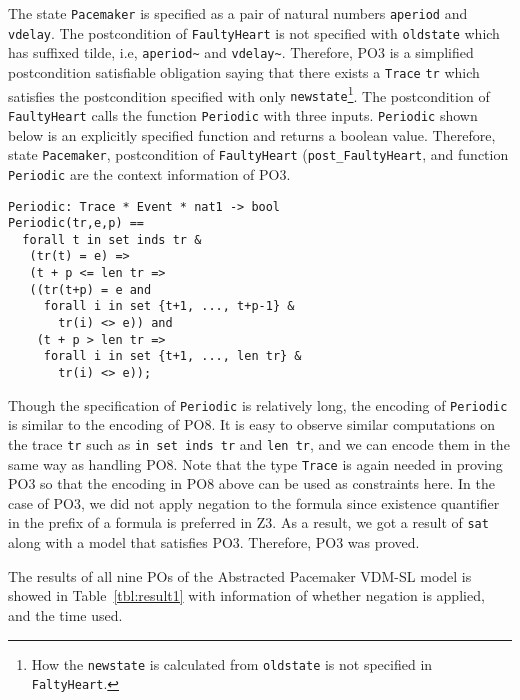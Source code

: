 The state {\tt Pacemaker} is specified as a pair of natural numbers {\tt aperiod} and {\tt vdelay}. The postcondition of {\tt FaultyHeart} is not specified with {\tt oldstate} which has suffixed tilde, i.e, {\tt aperiod\textasciitilde} and {\tt vdelay\textasciitilde}. Therefore, PO3 is a simplified postcondition satisfiable obligation saying that there exists a {\tt Trace} {\tt tr} which satisfies the postcondition specified with only {\tt newstate}\footnote{How the {\tt newstate} is calculated from {\tt oldstate} is not specified in {\tt FaltyHeart}.}. The postcondition of {\tt FaultyHeart} calls the function {\tt Periodic} with three inputs. {\tt Periodic} shown below is an explicitly specified function and returns a boolean value. Therefore, state {\tt Pacemaker}, postcondition of {\tt FaultyHeart} ({\tt post\_FaultyHeart}, and function {\tt Periodic} are the context information of PO3. 

\begin{mdframed}[roundcorner=5pt]
\begin{Verbatim}[fontsize=\small]
Periodic: Trace * Event * nat1 -> bool
Periodic(tr,e,p) ==
  forall t in set inds tr &
   (tr(t) = e) =>
   (t + p <= len tr =>
   ((tr(t+p) = e and
     forall i in set {t+1, ..., t+p-1} &
       tr(i) <> e)) and
    (t + p > len tr =>
     forall i in set {t+1, ..., len tr} &
       tr(i) <> e));
\end{Verbatim}
\end{mdframed}

Though the specification of {\tt Periodic} is relatively long, the encoding of {\tt Periodic} is similar to the encoding of PO8. It is easy to observe similar computations on the trace {\tt tr} such as {\tt in set inds tr} and {\tt len tr}, and we can encode them in the same way as handling PO8. Note that the type {\tt Trace} is again needed in proving PO3 so that the encoding in PO8 above can be used as constraints here. In the case of PO3, we did not apply negation to the formula since existence quantifier in the prefix of a formula is preferred in Z3. As a result, we got a result of {\tt sat} along with a model that satisfies PO3. Therefore, PO3 was proved.

The results of all nine POs of the Abstracted Pacemaker VDM-SL model is showed in Table~\ref{tbl:result1} with information of whether negation is applied, and the time used.

